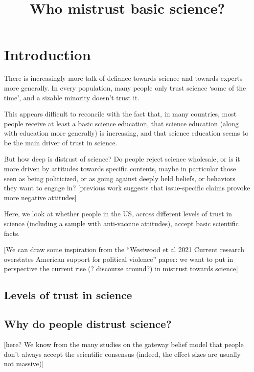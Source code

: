 \documentclass[
  doc,floatsintext]{apa6}
\title{Who mistrust basic science?}
\author{\phantom{0}}
\date{}
\affiliation{\vspace{0.5cm}\textsuperscript{} }
\begin{document}
\maketitle

\section{Introduction}\label{introduction}

There is increasingly more talk of defiance towards science and towards experts more generally. In every population, many people only trust science `some of the time', and a sizable minority doesn't trust it.

This appears difficult to reconcile with the fact that, in many countries, most people receive at least a basic science education, that science education (along with education more generally) is increasing, and that science education seems to be the main driver of trust in science.

But how deep is distrust of science? Do people reject science wholesale, or is it more driven by attitudes towards specific contents, maybe in particular those seen as being politicized, or as going against deeply held beliefs, or behaviors they want to engage in? {[}previous work suggests that issue-specific claims provoke more negative attitudes{]}

Here, we look at whether people in the US, across different levels of trust in science (including a sample with anti-vaccine attitudes), accept basic scientific facts.

{[}We can draw some inspiration from the ``Westwood et al 2021 Current research overstates American support for political violence'' paper: we want to put in perspective the current rise (? discourse around?) in mistrust towards science{]}

\subsection{Levels of trust in science}\label{levels-of-trust-in-science}

\subsection{Why do people distrust science?}\label{why-do-people-distrust-science}

{[}here? We know from the many studies on the gateway belief model that people don't always accept the scientific consensus (indeed, the effect sizes are usually not massive){]}
\end{document}
